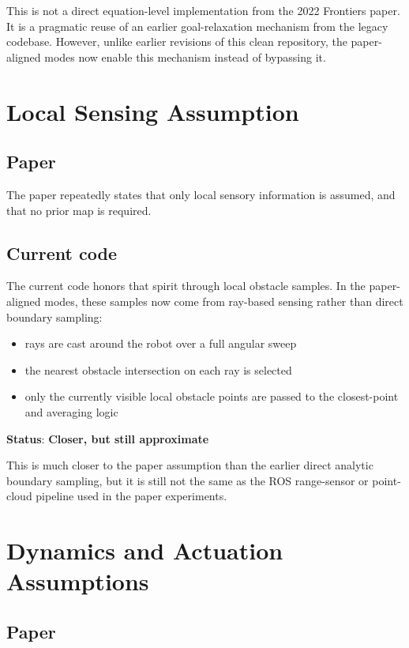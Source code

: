 \documentclass[11pt]{article}
\begin{document}
This is not a direct equation-level implementation from the 2022 Frontiers
paper. It is a pragmatic reuse of an earlier goal-relaxation mechanism from the
legacy codebase. However, unlike earlier revisions of this clean repository,
the paper-aligned modes now enable this mechanism instead of bypassing it.

\section*{Local Sensing Assumption}

\subsection*{Paper}

The paper repeatedly states that only local sensory information is assumed, and
that no prior map is required.

\subsection*{Current code}

The current code honors that spirit through local obstacle samples. In the
paper-aligned modes, these samples now come from ray-based sensing rather than
direct boundary sampling:

\begin{itemize}[leftmargin=*]
  \item rays are cast around the robot over a full angular sweep
  \item the nearest obstacle intersection on each ray is selected
  \item only the currently visible local obstacle points are passed to the
  closest-point and averaging logic
\end{itemize}

\textbf{Status}: \textbf{Closer, but still approximate}

This is much closer to the paper assumption than the earlier direct analytic
boundary sampling, but it is still not the same as the ROS range-sensor or
point-cloud pipeline used in the paper experiments.

\section*{Dynamics and Actuation Assumptions}

\subsection*{Paper}
\end{document}
